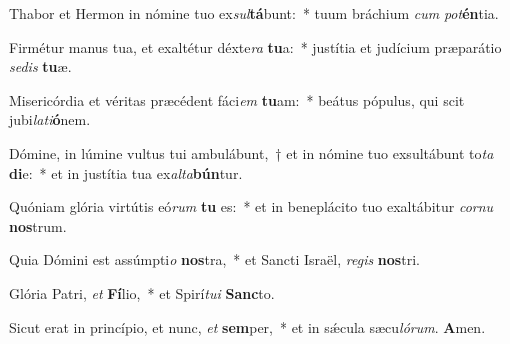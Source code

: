 \item Thabor et Hermon in nómine tuo ex\textit{sul}\textbf{tá}bunt:~* tuum bráchium \textit{cum} \textit{pot}\textbf{én}tia.

\item Firmétur manus tua, et exaltétur déxte\textit{ra} \textbf{tu}a:~* justítia et judícium præparátio \textit{se}\textit{dis} \textbf{tu}æ.

\item Misericórdia et véritas præcédent fáci\textit{em} \textbf{tu}am:~* beátus pópulus, qui scit jubi\textit{la}\textit{ti}\textbf{ó}nem.

\item Dómine, in lúmine vultus tui ambulábunt,~† et in nómine tuo exsultábunt to\textit{ta} \textbf{di}e:~* et in justítia tua ex\textit{al}\textit{ta}\textbf{bún}tur.

\item Quóniam glória virtútis eó\textit{rum} \textbf{tu} es:~* et in beneplácito tuo exaltábitur \textit{cor}\textit{nu} \textbf{nos}trum.

\item Quia Dómini est assúmpti\textit{o} \textbf{nos}tra,~* et Sancti Israël, \textit{re}\textit{gis} \textbf{nos}tri.

\item Glória Patri, \textit{et} \textbf{Fí}lio,~* et Spirí\textit{tu}\textit{i} \textbf{Sanc}to.

\item Sicut erat in princípio, et nunc, \textit{et} \textbf{sem}per,~* et in sǽcula sæcu\textit{ló}\textit{rum}. \textbf{A}men.
